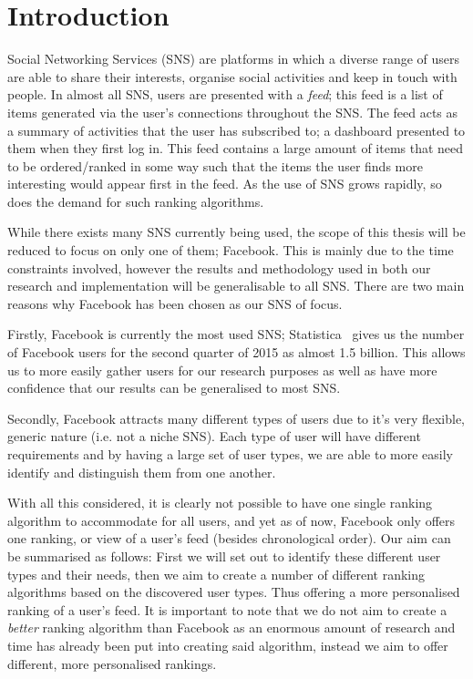 \chapter{Introduction}\label{ch:intro}

Social Networking Services (SNS) are platforms in which a diverse range of users are able to share their interests, organise social activities and keep in touch with people. In almost all SNS, users are presented with a \textit{feed}; this feed is a list of items generated via the user's connections throughout the SNS. The feed acts as a summary of activities that the user has subscribed to; a dashboard presented to them when they first log in. This feed contains a large amount of items that need to be ordered/ranked in some way such that the items the user finds more interesting would appear first in the feed. As the use of SNS grows rapidly, so does the demand for such ranking algorithms.

While there exists many SNS currently being used, the scope of this thesis will be reduced to focus on only one of them; Facebook. This is mainly due to the time constraints involved, however the results and methodology used in both our research and implementation will be generalisable to all SNS. There are two main reasons why Facebook has been chosen as our SNS of focus.

Firstly, Facebook is currently the most used SNS; Statistica~\cite{statistica2015facebook} gives us the number of Facebook users for the second quarter of 2015 as almost 1.5 billion. This allows us to more easily gather users for our research purposes as well as have more confidence that our results can be generalised to most SNS.

Secondly, Facebook attracts many different types of users due to it's very flexible, generic nature (i.e. not a niche SNS). Each type of user will have different requirements and by having a large set of user types, we are able to more easily identify and distinguish them from one another.

With all this considered, it is clearly not possible to have one single ranking algorithm to accommodate for all users, and yet as of now, Facebook only offers one ranking, or view of a user's feed (besides chronological order). Our aim can be summarised as follows: First we will set out to identify these different user types and their needs, then we aim to create a number of different ranking algorithms based on the discovered user types. Thus offering a more personalised ranking of a user's feed. It is important to note that we do not aim to create a \textit{better} ranking algorithm than Facebook as an enormous amount of research and time has already been put into creating said algorithm, instead we aim to offer different, more personalised rankings.

